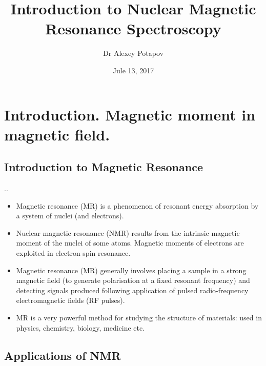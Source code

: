 \documentclass{beamer}
\title{Introduction to Nuclear Magnetic Resonance Spectroscopy}
\author{Dr Alexey Potapov}
\institute{University of Nottingham, School of Physics and Astronomy}
\date{Jule 13, 2017}
\begin{document}
	
	\begin{frame}
		\titlepage
	\end{frame}
	
	\section{Introduction. Magnetic moment in magnetic field.}
	\subsection{Introduction to Magnetic Resonance}	
	\begin{frame}{\thesection.\thesubsection. \insertsubsection}

		
		\begin{itemize}
		\item Magnetic resonance (MR) is a phenomenon of resonant energy absorption by a system of nuclei (and electrons). 
		\item Nuclear magnetic resonance (NMR) results from the intrinsic magnetic moment of the
		nuclei of some atoms. Magnetic moments of electrons are exploited in electron spin resonance.
		\item Magnetic resonance (MR) generally involves placing a sample in a strong magnetic
		field (to generate polarisation at a fixed resonant frequency) and detecting signals
		produced following application of pulsed radio-frequency electromagnetic fields (RF
		pulses).
		\item MR is a very powerful method for studying the structure of materials: used in physics, chemistry, biology, medicine etc.

		\end{itemize}
	\end{frame}
	
	\subsection{Applications of NMR}
	
	  	
	
\end{document}
